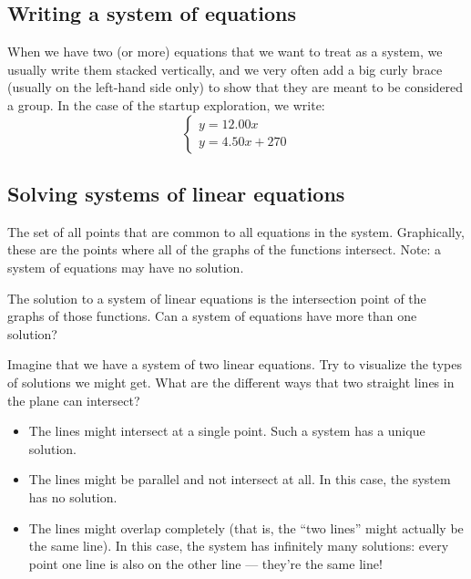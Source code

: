 \subsection{Writing a system of equations}

When we have two (or more) equations that we want to treat as a system, we usually write them stacked vertically, and we very often add a big curly brace (usually on the left-hand side only) to show that they are meant to be considered a group. In the case of the startup exploration, we write: \[\left\{\begin{array}{l}y=12.00x\\y=4.50x+270\end{array}\right.\]

\subsection{Solving systems of linear equations}

\begin{boxeddef}
The set of all points that are common to all equations in the system. Graphically, these are the points where all of the graphs of the functions intersect. Note: a system of equations may have no solution.
\end{boxeddef}

The solution to a system of linear equations is the intersection point of the graphs of those functions. Can a system of equations have more than one solution?

Imagine that we have a system of two linear equations. Try to visualize the types of solutions we might get. What are the different ways that two straight lines in the plane can intersect?

\begin{itemize}
\item The lines might intersect at a single point. Such a system has a unique solution.

\item The lines might be parallel and not intersect at all. In this case, the system has no solution.

\item The lines might overlap completely (that is, the ``two lines'' might actually be the same line). In this case, the system has infinitely many solutions: every point one line is also on the other line --- they're the same line!
\end{itemize}

